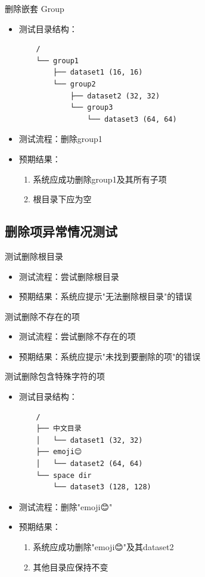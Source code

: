 \documentclass[a4paper,12pt]{report}	%
\begin{document}
删除嵌套 Group
\begin{itemize}
    \item 测试目录结构：
    \begin{verbatim}
    /
    └── group1
        ├── dataset1 (16, 16)
        └── group2
            ├── dataset2 (32, 32)
            └── group3
                └── dataset3 (64, 64)
    \end{verbatim}
    \item 测试流程：删除group1
    \item 预期结果：
    \begin{enumerate}
        \item 系统应成功删除group1及其所有子项
        \item 根目录下应为空
    \end{enumerate}
\end{itemize}

\subsection{删除项异常情况测试}
测试删除根目录
\begin{itemize}
    \item 测试流程：尝试删除根目录
    \item 预期结果：系统应提示"无法删除根目录"的错误
\end{itemize}

测试删除不存在的项
\begin{itemize}
    \item 测试流程：尝试删除不存在的项
    \item 预期结果：系统应提示"未找到要删除的项"的错误
\end{itemize}

测试删除包含特殊字符的项
\begin{itemize}
    \item 测试目录结构：
    \begin{verbatim}
    /
    ├── 中文目录
    │   └── dataset1 (32, 32)
    ├── emoji😊
    │   └── dataset2 (64, 64)
    └── space dir
        └── dataset3 (128, 128)
    \end{verbatim}
    \item 测试流程：删除"emoji😊"
    \item 预期结果：
    \begin{enumerate}
        \item 系统应成功删除"emoji😊"及其dataset2
        \item 其他目录应保持不变
    \end{enumerate}
\end{itemize}
\end{document}
